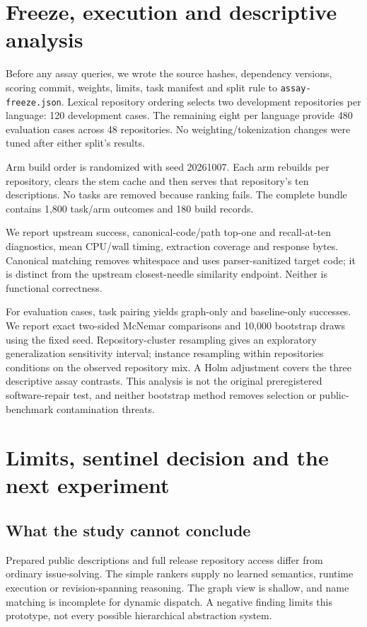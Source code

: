 \documentclass[11pt]{article}
\begin{document}
\section{Freeze, execution and descriptive analysis}
Before any assay queries, we wrote the source hashes, dependency versions, scoring commit, weights, limits, task manifest and split rule to \texttt{assay-freeze.json}. Lexical repository ordering selects two development repositories per language: 120 development cases. The remaining eight per language provide 480 evaluation cases across 48 repositories. No weighting/tokenization changes were tuned after either split's results.

Arm build order is randomized with seed 20261007. Each arm rebuilds per repository, clears the stem cache and then serves that repository's ten descriptions. No tasks are removed because ranking fails. The complete bundle contains 1,800 task/arm outcomes and 180 build records.

We report upstream success, canonical-code/path top-one and recall-at-ten diagnostics, mean CPU/wall timing, extraction coverage and response bytes. Canonical matching removes whitespace and uses parser-sanitized target code; it is distinct from the upstream closest-needle similarity endpoint. Neither is functional correctness.

For evaluation cases, task pairing yields graph-only and baseline-only successes. We report exact two-sided McNemar comparisons and 10,000 bootstrap draws using the fixed seed. Repository-cluster resampling gives an exploratory generalization sensitivity interval; instance resampling within repositories conditions on the observed repository mix. A Holm adjustment covers the three descriptive assay contrasts. This analysis is not the original preregistered software-repair test, and neither bootstrap method removes selection or public-benchmark contamination threats.

\section{Limits, sentinel decision and the next experiment}
\subsection{What the study cannot conclude}
Prepared public descriptions and full release repository access differ from ordinary issue-solving. The simple rankers supply no learned semantics, runtime execution or revision-spanning reasoning. The graph view is shallow, and name matching is incomplete for dynamic dispatch. A negative finding limits this prototype, not every possible hierarchical abstraction system.
\end{document}
